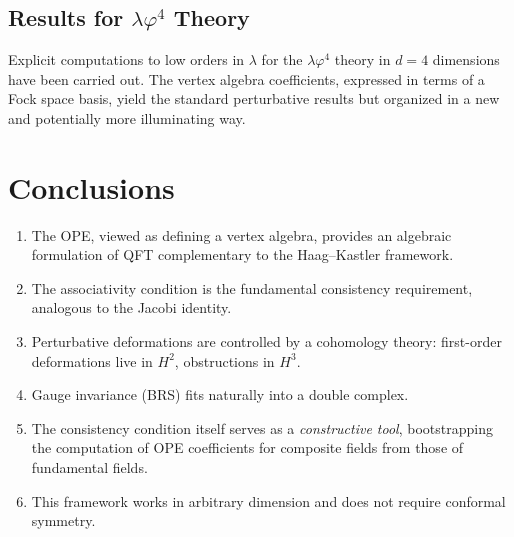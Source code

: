 \documentclass[11pt,a4paper]{article}
\begin{document}
\subsection{Results for $\lambda\varphi^4$ Theory}

Explicit computations to low orders in $\lambda$ for the $\lambda\varphi^4$
theory in $d=4$ dimensions have been carried out. The vertex algebra
coefficients, expressed in terms of a Fock space basis, yield the standard
perturbative results but organized in a new and potentially more
illuminating way.

\section{Conclusions}

\begin{enumerate}[nosep]
  \item The OPE, viewed as defining a vertex algebra, provides an
        algebraic formulation of QFT complementary to the Haag--Kastler
        framework.
  \item The associativity condition is the fundamental consistency
        requirement, analogous to the Jacobi identity.
  \item Perturbative deformations are controlled by a cohomology theory:
        first-order deformations live in $H^2$, obstructions in $H^3$.
  \item Gauge invariance (BRS) fits naturally into a double complex.
  \item The consistency condition itself serves as a \emph{constructive tool},
        bootstrapping the computation of OPE coefficients for composite fields
        from those of fundamental fields.
  \item This framework works in arbitrary dimension and does not require
        conformal symmetry.
\end{enumerate}
\end{document}
